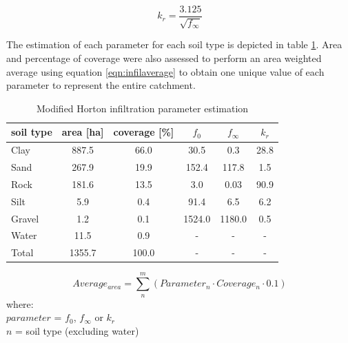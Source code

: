 \begin{equation}
\label{eqn:k_r}
k_r = \frac{3.125}{\sqrt{f_\infty}}
\end{equation}


The estimation of each parameter for each soil type is depicted in table \ref{tbl:infparamest}. Area and percentage of coverage were also assessed to perform an area weighted average using equation \ref{eqn:infilaverage} to obtain one unique value of each parameter to represent the entire catchment.


\begin{table}[h]
\caption{Modified Horton infiltration parameter estimation}
\label{tbl:infparamest}
\centering
\begin{tabular}{@{}lccccc@{}}
\toprule
\textbf{soil type} & \textbf{area [ha]} & \textbf{coverage [\%]} & \textbf{$f_0$} & \textbf{$f_\infty$} & \textbf{$k_r$} \\
\midrule
Clay               & 887.5                 & 66.0                       & 30.5          & 0.3                            & 28.8          \\
Sand               & 267.9                 & 19.9                       & 152.4         & 117.8                          & 1.5           \\
Rock               & 181.6                 & 13.5                       & 3.0           & 0.03                            & 90.9          \\
Silt               & 5.9                   & 0.4                        & 91.4          & 6.5                            & 6.2           \\
Gravel             & 1.2                   & 0.1                        & 1524.0        & 1180.0                         & 0.5           \\
Water              & 11.5                  & 0.9                        & -             & -                              & -             \\ \midrule
Total              & 1355.7                & 100.0                      & -             & -                              & - \\           
\bottomrule
\end{tabular}
\end{table}

\begin{equation}
\label{eqn:infilaverage}
Average_{area} = \sum_{n}^{m}(Parameter_n \cdot Coverage_n \cdot 0.1)
\end{equation}
where: \\
\indent $parameter$ = $f_0$, $f_\infty$ or $k_r$ \\
\indent $n$ = soil type (excluding water) \\



